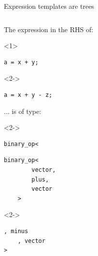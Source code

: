\documentclass[@BEAMER_OPTIONS@]{beamer}
\begin{document}
\begin{frame}[fragile]{Expression templates are trees}
    \begin{columns}
        \begin{column}{0.45\textwidth}
            \begin{exampleblock}{The expression in the RHS of:}
                \begin{onlyenv}<1>
                    \begin{lstlisting}
a = x + y;
                    \end{lstlisting}
                \end{onlyenv}
                \begin{onlyenv}<2->
                    \begin{lstlisting}
a = x + y - z;
                    \end{lstlisting}
                \end{onlyenv}
            \end{exampleblock}
            \begin{exampleblock}{... is of type:}
                \begin{uncoverenv}<2->
                    \begin{lstlisting}[numbers=none]
binary_op<
                    \end{lstlisting}
                \end{uncoverenv}
                \begin{lstlisting}[numbers=none]
    binary_op<
        vector,
        plus,
        vector
    >
                \end{lstlisting}
                \begin{uncoverenv}<2->
                    \begin{lstlisting}[numbers=none]
    , minus
    , vector
>
                    \end{lstlisting}
                \end{uncoverenv}
            \end{exampleblock}
        \end{column}
        \begin{column}{0.45\textwidth}
            \begin{figure}
\end{figure}
\end{column}
\end{columns}
\end{frame}
\end{document}
